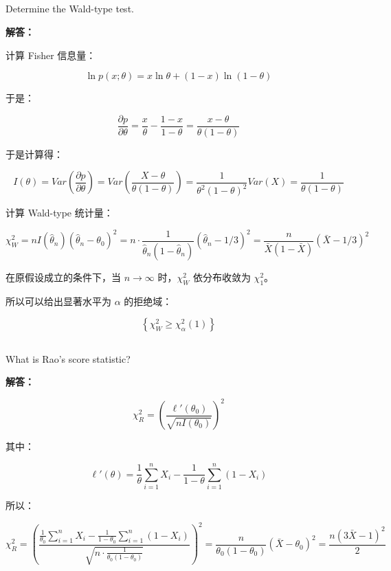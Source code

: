 \documentclass[12pt,a4paper]{article}
\begin{document}
\subsection{}

Determine the Wald-type test.

\begin{answerbox}
\textbf{解答：}

计算 Fisher 信息量：

$$
\ln p(x; \theta) = x \ln \theta + (1-x) \ln (1-\theta)
$$

于是：

$$
\frac{\partial p}{\partial \theta} = \frac{x}{\theta} - \frac{1-x}{1-\theta} = \frac{x - \theta}{\theta(1-\theta)}
$$

于是计算得：

$$
I(\theta) = Var\left(\frac{\partial p}{\partial \theta}\right) = Var\left(\frac{X - \theta}{\theta(1-\theta)}\right) = \frac{1}{\theta^2 (1-\theta)^2} Var(X) = \frac{1}{\theta(1-\theta)}
$$

计算 Wald-type 统计量：

$$
\chi^2_W = n I(\hat{\theta}_n)(\hat{\theta}_n - \theta_0)^2 = n \cdot \frac{1}{\hat{\theta}_n (1-\hat{\theta}_n)} (\hat{\theta}_n - 1/3)^2 = \frac{n}{\bar{X}(1-\bar{X})} (\bar{X} - 1/3)^2
$$

在原假设成立的条件下，当 $n \to \infty$ 时，$\chi^2_W$ 依分布收敛为 $\chi^2_1$。

所以可以给出显著水平为 $\alpha$ 的拒绝域：

$$
\left\{\chi^2_W \geq \chi^2_{\alpha}(1)\right\}
$$

\end{answerbox}


\subsection{}

What is Rao's score statistic?

\begin{answerbox}
\textbf{解答：}

$$
\chi^2_R = \left(\frac{\ell'(\theta_0)}{\sqrt{nI(\theta_0)}}\right)^2 
$$

其中：

$$
\ell'(\theta) =  \frac{1}{\theta} \sum_{i=1}^n X_i - \frac{1}{1-\theta} \sum_{i=1}^n (1 - X_i)
$$

所以：

$$
\chi^2_R = \left(\frac{\frac{1}{\theta_0} \sum_{i=1}^n X_i - \frac{1}{1-\theta_0} \sum_{i=1}^n (1 - X_i)}{\sqrt{n \cdot \frac{1}{\theta_0(1-\theta_0)}}}\right)^2 = \frac{n}{\theta_0(1-\theta_0)} \left( \bar{X} - \theta_0 \right)^2= \frac{n(3\bar{X}-1)^2}{2}
$$


\end{answerbox}
\end{document}

